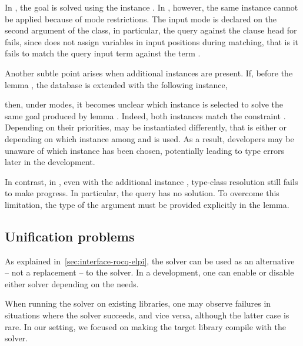 In \rocq, the goal is solved using the instance . In \elpi, however,
the same instance cannot be applied because of mode restrictions. The input mode
is declared on the second argument of the class, in particular, \matching the
query  against the clause head for
 fails, since \elpi does not assign variables in input positions
during matching, that is it fails to match the query input term  against the term .

Another subtle point arises when additional instances are present. If,
before the lemma , the database is extended with the
following instance,

\mvspace{}
\noindent

\mvspace{}

\noindent then, under \rocq modes, it becomes unclear which instance is selected
to solve the same goal produced by lemma . Indeed, both instances
match the constraint . Depending on their priorities,
 may be instantiated differently, that is either  or 
depending on which instance among  and  is used. As a
result, developers may be unaware of which instance has been chosen, potentially
leading to type errors later in the development.

In contrast, in \elpi, even with the additional instance ,
type-class resolution still fails to make progress. In particular, the
query  has no solution. To overcome
this limitation, the type of the argument  must be provided
explicitly in the lemma.

\mvspace{}
\noindent

\mvspace{}


\subsection{Unification problems}
\label{sec:unif-problems}

As explained in~\cref{sec:interface-rocq-elpi}, the \elpi solver can be used as
an alternative -- not a replacement -- to the \rocq solver. In a development,
one can enable or disable either solver depending on the needs.

When running the \elpi solver on existing libraries, one may observe
failures in situations where the \rocq solver succeeds, and vice versa,
although the latter case is rare. In our setting, we focused on making the
target library compile with the \elpi solver. %

